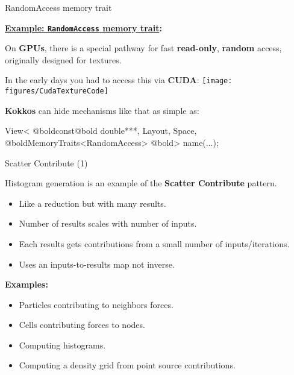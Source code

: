 
\begin{frame}[fragile]{RandomAccess memory trait}

  \textbf{\ul{Example: \texttt{RandomAccess} memory trait}:}

  \vspace{3pt}

  On \textbf{GPUs}, there is a special pathway for fast \textbf{read-only}, \textbf{random} access, originally designed for textures.

  \vspace{5pt}
  \pause

  In the early days you had to access this via \textbf{CUDA}:
  \vspace{5pt}
  \texttt{[image: figures/CudaTextureCode]}

  \vspace{0pt}
  \pause
  \textbf{Kokkos} can hide mechanisms like that as simple as:
  \vspace{-5pt}

  \begin{code}[keywords={}]
View< @boldconst@bold double***, Layout, Space,
     @boldMemoryTraits<RandomAccess> @bold> name(...);
  \end{code}

\end{frame}


\begin{frame}[fragile]{Scatter Contribute (1)}

  Histogram generation is an example of the \textbf{Scatter Contribute} pattern.
 
  \begin{itemize}
    \item{Like a reduction but with many results.}
    \item{Number of results scales with number of inputs.}
    \item{Each results gets contributions from a small number of inputs/iterations.}
    \item{Uses an inputs-to-results map not inverse.}
  \end{itemize}

  \textbf{Examples:}
  \begin{itemize}
    \item{Particles contributing to neighbors forces.}
    \item{Cells contributing forces to nodes.}
    \item{Computing histograms.}
    \item{Computing a density grid from point source contributions.}
  \end{itemize}

\end{frame}


